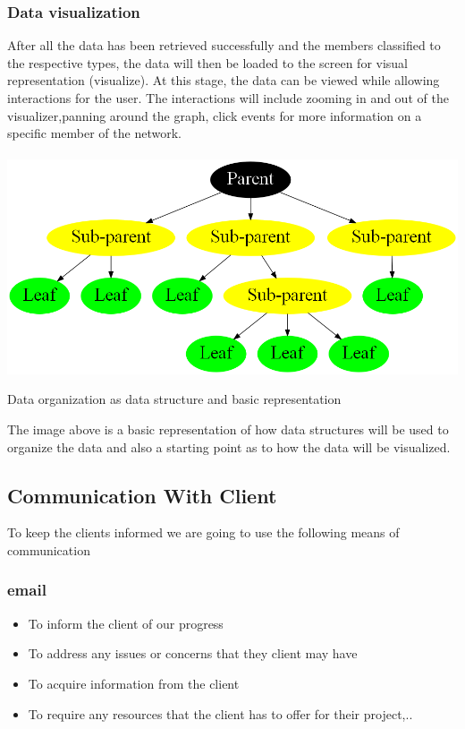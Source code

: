 \documentclass[a4paper,12pt]{article}
\begin{document}
\subsubsection{Data visualization}
After all the data has been retrieved successfully and the members classified to the respective types, the data will then be loaded to the screen for visual representation (visualize). At this stage, the data can be viewed while allowing interactions for the user. The interactions will include zooming in and out of the visualizer,panning around the graph, click events for more information on a specific member of the network.\\ \\
\includegraphics[width=\textwidth]{images/graph1.png}
\begin{center}
Data organization as data structure and basic representation
\end{center}
The image above is a basic representation of how data structures will be used to organize the data and also a starting point as to how the data will be visualized.
\subsection{Communication With Client}
To keep the clients informed we are going to use the following means of communication
\subsubsection{email}
\begin{itemize}
\item To inform the client of our progress
\item To address any issues or concerns that they client may have
\item To acquire information from the client
\item To require any resources that the client has to offer for their project,..
\end{itemize}
\end{document}
